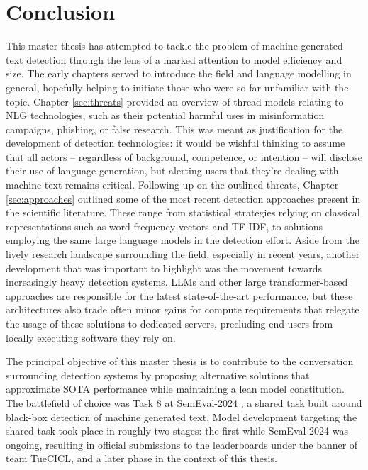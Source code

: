 \section{Conclusion}
\label{sec:conclusion}

This master thesis has attempted to tackle the problem of machine-generated text detection through the lens of a marked attention to model efficiency and size.
The early chapters served to introduce the field and language modelling in general, hopefully helping to initiate those who were so far unfamiliar with the topic.
Chapter \ref{sec:threats} provided an overview of thread models relating to NLG technologies, such as their potential harmful uses in misinformation campaigns, phishing, or false research.
This was meant as justification for the development of detection technologies: it would be wishful thinking to assume that all actors -- regardless of background, competence, or intention -- will disclose their use of language generation, but alerting users that they're dealing with machine text remains critical.
Following up on the outlined threats, Chapter \ref{sec:approaches} outlined some of the most recent detection approaches present in the scientific literature.
These range from statistical strategies relying on classical representations such as word-frequency vectors and TF-IDF, to solutions employing the same large language models in the detection effort.
Aside from the lively research landscape surrounding the field, especially in recent years, another development that was important to highlight was the movement towards increasingly heavy detection systems.
LLMs and other large transformer-based approaches are responsible for the latest state-of-the-art performance, but these architectures also trade often minor gains for compute requirements that relegate the usage of these solutions to dedicated servers, precluding end users from locally executing software they rely on.

The principal objective of this master thesis is to contribute to the conversation surrounding detection systems by proposing alternative solutions that approximate SOTA performance while maintaining a lean model constitution.
The battlefield of choice was Task 8 at SemEval-2024 \citep{wang2024semeval}, a shared task built around black-box detection of machine generated text.
Model development targeting the shared task took place in roughly two stages: the first while SemEval-2024 was ongoing, resulting in official submissions to the leaderboards under the banner of team TueCICL, and a later phase in the context of this thesis.

